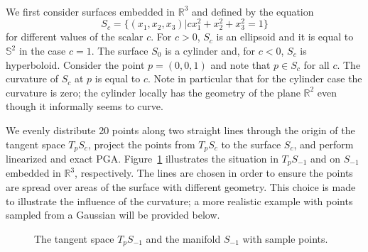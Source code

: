 \documentclass[final]{svjour3}
\newcommand{\RR}{\mathbb{R}}
\newcommand{\SSS}{\mathbb{S}}
\begin{document}
\ \\
We first consider surfaces embedded in $\RR^3$ and defined by the equation
\begin{equation*}
    S_c=\{(x_1,x_2,x_3)|cx_1^2+x_2^2+x_3^2=1\}
\end{equation*}
for different values of the scalar $c$. For $c>0$, $S_c$ is an ellipsoid
and it is equal to $\SSS^2$ in the case $c=1$. The surface $S_0$ is a cylinder and, for
$c<0$, $S_c$ is hyperboloid. Consider the point $p=(0,0,1)$ and note that $p\in S_c$ for all $c$. 
The curvature of $S_c$ at $p$ is equal to $c$. Note in particular that for the
cylinder case the curvature is zero; the cylinder locally has the geometry
of the plane $\RR^2$ even though it informally seems to curve.

We evenly distribute 20 points along two straight lines
through the origin of the tangent space $T_pS_c$, project the points 
from $T_pS_c$ to the surface $S_c$, and perform linearized and exact PGA. 
Figure~\ref{fig:low} illustrates the
situation in $T_pS_{-1}$ and on $S_{-1}$ embedded in $\RR^3$, respectively.
The lines are chosen in order to ensure the points are spread over areas of the
surface with different geometry. This choice is made to illustrate the influence
of the curvature;
a more realistic example with points sampled from a Gaussian will be provided
below.
\begin{figure}[h]
    \begin{center}
    \end{center}
    \caption{The tangent space $T_pS_{-1}$ and the manifold $S_{-1}$ with sample
  points.}
    \label{fig:low}
\end{figure}
\end{document}
